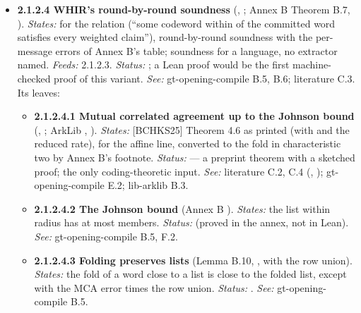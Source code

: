 \begin{itemize}[label={}, leftmargin=1.3em, itemindent=-1.3em, labelwidth=0pt, labelsep=0pt, itemsep=4pt, topsep=3pt]
\begin{itemize}[label={}, leftmargin=1.3em, itemindent=-1.3em, labelwidth=0pt, labelsep=0pt, itemsep=4pt, topsep=3pt]
\begin{itemize}[label={}, leftmargin=1.3em, itemindent=-1.3em, labelwidth=0pt, labelsep=0pt, itemsep=4pt, topsep=3pt]
\end{itemize}
\item {}\label{obl:node-2.1.2.4}\textbf{2.1.2.4 WHIR's round-by-round soundness} (, ; Annex B Theorem B.7, ). \emph{States:} for the relation  (``some codeword within  of the committed word satisfies every weighted claim''), round-by-round soundness with the per-message errors of Annex B's table; soundness for a language, no extractor named. \emph{Feeds:} 2.1.2.3. \emph{Status:} ; a Lean proof would be the first machine-checked proof of this variant. \emph{See:} gt-opening-compile B.5, B.6; literature C.3. Its leaves:
\begin{itemize}[label={}, leftmargin=1.3em, itemindent=-1.3em, labelwidth=0pt, labelsep=0pt, itemsep=4pt, topsep=3pt]
\item {}\label{obl:node-2.1.2.4.1}\textbf{2.1.2.4.1 Mutual correlated agreement up to the Johnson bound} (, ; ArkLib , ). \emph{States:} [BCHKS25] Theorem 4.6 as printed (with  and the reduced rate), for the affine line, converted to the fold in characteristic two by Annex B's footnote. \emph{Status:}   — a preprint theorem with a sketched proof; the only coding-theoretic input. \emph{See:} literature C.2, C.4 (, ); gt-opening-compile E.2; lib-arklib B.3.
\item {}\label{obl:node-2.1.2.4.2}\textbf{2.1.2.4.2 The Johnson bound} (Annex B ). \emph{States:} the list within radius  has at most  members. \emph{Status:}  (proved in the annex, not in Lean). \emph{See:} gt-opening-compile B.5, F.2.
\item {}\label{obl:node-2.1.2.4.3}\textbf{2.1.2.4.3 Folding preserves lists} (Lemma B.10, , with the  row union). \emph{States:} the fold of a word close to a list is close to the folded list, except with the MCA error times the row union. \emph{Status:} . \emph{See:} gt-opening-compile B.5.

\end{itemize}
\end{itemize}
\end{itemize}
